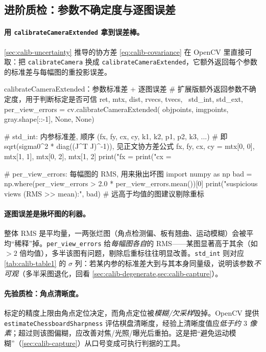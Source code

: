 \subsection{进阶质检：参数不确定度与逐图误差}
\label{sec:calib-opencv-quality}

\paragraph{用 \texttt{calibrateCameraExtended} 拿到误差棒。}
\cref{sec:calib-uncertainty} 推导的协方差 \cref{eq:calib-covariance} 在 OpenCV 里直接可取：把 \texttt{calibrateCamera} 换成 \texttt{calibrateCameraExtended}，它额外返回每个参数的标准差与每幅图的重投影误差\cite{opencv2024calib}。

\begin{codebox}[Python]{calibrateCameraExtended：参数标准差 + 逐图误差}
# 扩展版额外返回参数不确定度，用于判断标定是否可信
ret, mtx, dist, rvecs, tvecs, \
    std_int, std_ext, per_view_errors = cv.calibrateCameraExtended(
        objpoints, imgpoints, gray.shape[::-1], None, None)

# std_int: 内参标准差, 顺序 (fx, fy, cx, cy, k1, k2, p1, p2, k3, ...)
#          即 sqrt(sigma0^2 * diag((J^T J)^-1)), 见正文协方差公式
fx, fy, cx, cy = mtx[0, 0], mtx[1, 1], mtx[0, 2], mtx[1, 2]
print("fx = %
print("cx = %

# per_view_errors: 每幅图的 RMS, 用来揪出坏图
import numpy as np
bad = np.where(per_view_errors > 2.0 * per_view_errors.mean())[0]
print("suspicious views (RMS >> mean):", bad)   # 远高于均值的图建议剔除重标
\end{codebox}

\paragraph{逐图误差是揪坏图的利器。}
整体 RMS 是平均量，一两张烂图（角点检测偏、板有翘曲、运动模糊）会被平均“稀释”掉。\texttt{per\_view\_errors} 给\emph{每幅图各自}的 RMS——某图显著高于其余（如 $>2$ 倍均值），多半该图有问题，剔除后重标往往明显改善。\texttt{std\_int} 则对应 \cref{tab:calib-table1} 的 $\sigma$ 列：若某内参的标准差大到与其本身同量级，说明该参数\emph{不可观}（多半采图退化，回看 \cref{sec:calib-degenerate,sec:calib-capture}）。

\paragraph{先验质检：角点清晰度。}
标定的精度上限由角点定位决定，而角点定位被\emph{模糊/欠采样}毁掉。OpenCV 提供 \texttt{estimateChessboardSharpness} 评估棋盘清晰度，经验上清晰度值应\emph{低于约 $3$ 像素}\cite{opencv2024calib}；超过则该图偏糊，应改善对焦/光照/曝光后重拍。这是把“避免运动模糊”（\cref{sec:calib-capture}）从口号变成可执行判据的工具。

